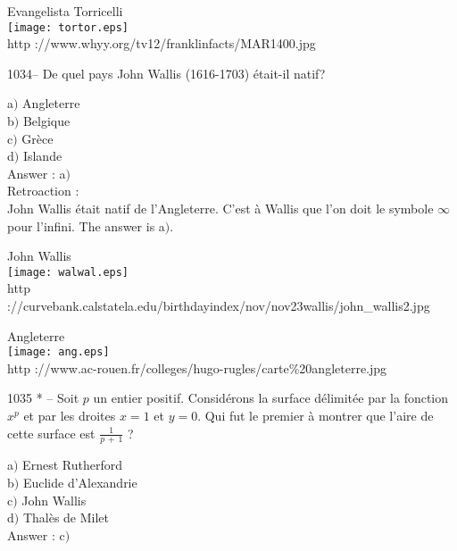 ﻿\documentclass[letterpaper, 12pt]{article}
\begin{document}
        \begin{center}
        Evangelista Torricelli\\
    \texttt{[image: tortor.eps]}\\
        {\footnotesize http ://www.whyy.org/tv12/franklinfacts/MAR1400.jpg}
    \end{center}

1034-- De quel pays John Wallis (1616-1703) \'etait-il natif?

a$)$ Angleterre \\
b$)$ Belgique \\
c$)$ Gr\`ece  \\
d$)$ Islande \\

Answer : a$)$\\

Retroaction :\\
John Wallis \'etait natif de l'Angleterre. C'est \`a Wallis que l'on
doit le symbole $\infty$ pour l'infini.
The answer is a$)$.\\

        \begin{center}
        John Wallis\\[2mm]
    \texttt{[image: walwal.eps]}\\
        {\footnotesize http
://curvebank.calstatela.edu/birthdayindex/nov/nov23wallis/john\_wallis2.jpg}
    \end{center}

        \begin{center}
        Angleterre\\
    \texttt{[image: ang.eps]}\\
        {\footnotesize http
://www.ac-rouen.fr/colleges/hugo-rugles/carte\%20angleterre.jpg}
    \end{center}

1035 * -- Soit $p$ un entier positif. Consid\'erons la surface
d\'elimit\'ee par la fonction $x^p$ et par les droites $x=1$ et
$y=0$. Qui fut le premier \`a montrer que l'aire de cette surface
est $\frac1{p\,+\,1}$ ?

a$)$ Ernest Rutherford \\
b$)$ Euclide d'Alexandrie  \\
c$)$ John Wallis  \\
d$)$ Thal\`es de Milet \\

Answer : c$)$\\
\end{document}
